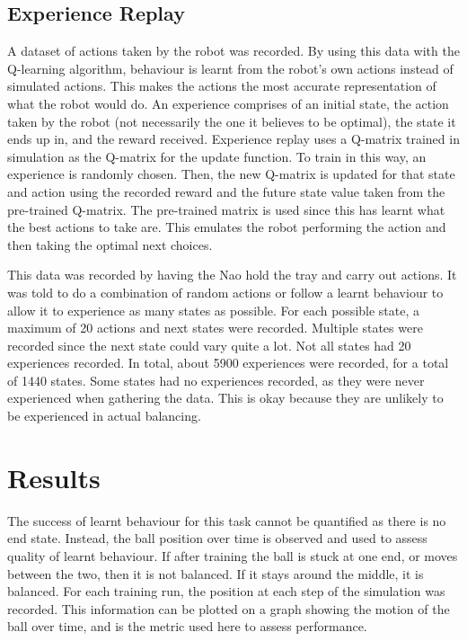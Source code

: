 \documentclass[12pt,a4paper]{article}
\begin{document}

\subsection{Experience Replay}
A dataset of actions taken by the robot was recorded. By using this data with the Q-learning algorithm, behaviour is learnt from the robot’s own actions instead of simulated actions. This makes the actions the most accurate representation of what the robot would do. An experience comprises of an initial state, the action taken by the robot (not necessarily the one it believes to be optimal), the state it ends up in, and the reward received. Experience replay uses a Q-matrix trained in simulation as the Q-matrix for the update function. To train in this way, an experience is randomly chosen. Then, the new Q-matrix is updated for that state and action using the recorded reward and the future state value taken from the pre-trained Q-matrix. The pre-trained matrix is used since this has learnt what the best actions to take are. This emulates the robot performing the action and then taking the optimal next choices. 

This data was recorded by having the Nao hold the tray and carry out actions. It was told to do a combination of random actions or follow a learnt behaviour to allow it to experience as many states as possible. For each possible state, a maximum of 20 actions and next states were recorded. Multiple states were recorded since the next state could vary quite a lot. Not all states had 20 experiences recorded. In total, about 5900 experiences were recorded, for a total of 1440 states. Some states had no experiences recorded, as they were never experienced when gathering the data. This is okay because they are unlikely to be experienced in actual balancing. 


\section{Results}
The success of learnt behaviour for this task cannot be quantified as there is no end state. Instead, the ball position over time is observed and used to assess quality of learnt behaviour. If after training the ball is stuck at one end, or moves between the two, then it is not balanced. If it stays around the middle, it is balanced. For each training run, the position at each step of the simulation was recorded. This information can be plotted on a graph showing the motion of the ball over time, and is the metric used here to assess performance. 
\end{document}
